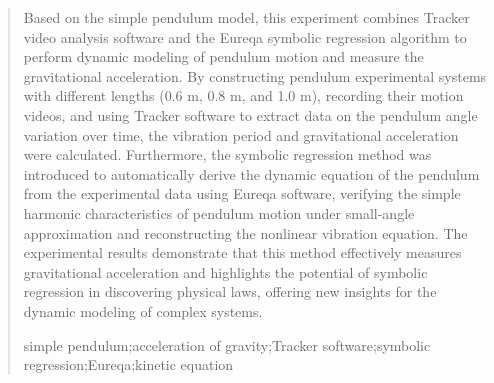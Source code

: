 \documentclass[12pt,a4paper]{article}
\begin{document}
\begin{quote}
    \fontsize{9}{10.8}\selectfont
    \setlength{\leftskip}{2em}
    \setlength{\rightskip}{2em}

    Based on the simple pendulum model, this experiment combines Tracker video analysis software and the Eureqa symbolic regression algorithm to perform dynamic modeling of pendulum motion and measure the gravitational acceleration. By constructing pendulum experimental systems with different lengths (0.6 m, 0.8 m, and 1.0 m), recording their motion videos, and using Tracker software to extract data on the pendulum angle variation over time, the vibration period and gravitational acceleration were calculated. Furthermore, the symbolic regression method was introduced to automatically derive the dynamic equation of the pendulum from the experimental data using Eureqa software, verifying the simple harmonic characteristics of pendulum motion under small-angle approximation and reconstructing the nonlinear vibration equation. The experimental results demonstrate that this method effectively measures gravitational acceleration and highlights the potential of symbolic regression in discovering physical laws, offering new insights for the dynamic modeling of complex systems.
    
    \vspace{0.5\baselineskip}
    simple pendulum;acceleration of gravity;Tracker software;symbolic regression;Eureqa;kinetic equation
\end{quote}

\vspace{1cm}
\end{document}
